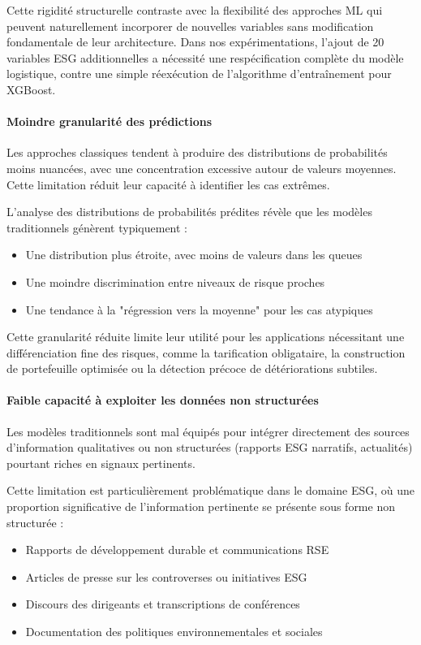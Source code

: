 Cette rigidité structurelle contraste avec la flexibilité des approches ML qui peuvent naturellement incorporer de nouvelles variables sans modification fondamentale de leur architecture. Dans nos expérimentations, l'ajout de 20 variables ESG additionnelles a nécessité une respécification complète du modèle logistique, contre une simple réexécution de l'algorithme d'entraînement pour XGBoost.

\paragraph{Moindre granularité des prédictions}

Les approches classiques tendent à produire des distributions de probabilités moins nuancées, avec une concentration excessive autour de valeurs moyennes. Cette limitation réduit leur capacité à identifier les cas extrêmes.

L'analyse des distributions de probabilités prédites révèle que les modèles traditionnels génèrent typiquement :
\begin{itemize}
    \item Une distribution plus étroite, avec moins de valeurs dans les queues
    \item Une moindre discrimination entre niveaux de risque proches
    \item Une tendance à la "régression vers la moyenne" pour les cas atypiques
\end{itemize}

Cette granularité réduite limite leur utilité pour les applications nécessitant une différenciation fine des risques, comme la tarification obligataire, la construction de portefeuille optimisée ou la détection précoce de détériorations subtiles.

\paragraph{Faible capacité à exploiter les données non structurées}

Les modèles traditionnels sont mal équipés pour intégrer directement des sources d'information qualitatives ou non structurées (rapports ESG narratifs, actualités) pourtant riches en signaux pertinents.

Cette limitation est particulièrement problématique dans le domaine ESG, où une proportion significative de l'information pertinente se présente sous forme non structurée :
\begin{itemize}
    \item Rapports de développement durable et communications RSE
    \item Articles de presse sur les controverses ou initiatives ESG
    \item Discours des dirigeants et transcriptions de conférences
    \item Documentation des politiques environnementales et sociales
\end{itemize}

